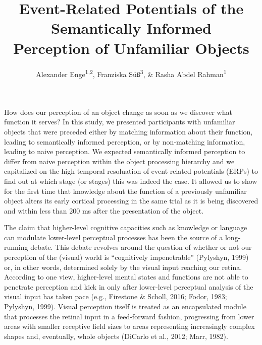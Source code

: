 \documentclass[
  english,
  man,floatsintext]{apa7}
\title{Event-Related Potentials of the Semantically Informed\\
Perception of Unfamiliar Objects}
\author{Alexander Enge\textsuperscript{1,2}, Franziska Süß\textsuperscript{3}, \& Rasha Abdel Rahman\textsuperscript{1}}
\date{}
\affiliation{\vspace{0.5cm}\textsuperscript{1} Humboldt-Universität zu Berlin\\\textsuperscript{2} Max Planck Institute for Human Cognitive and Brain Sciences\\\textsuperscript{3} Fachhochschule des Mittelstands}
\begin{document}
\maketitle

How does our perception of an object change as soon as we discover what function it serves? In this study, we presented participants with unfamiliar objects that were preceded either by matching information about their function, leading to semantically informed perception, or by non-matching information, leading to naive perception. We expected semantically informed perception to differ from naive perception within the object processing hierarchy and we capitalized on the high temporal resoluation of event-related potentials (ERPs) to find out at which stage (or stages) this was indeed the case. It allowed us to show for the first time that knowledge about the function of a previously unfamiliar object alters its early cortical processing in the same trial as it is being discovered and within less than 200 ms after the presentation of the object.

The claim that higher-level cognitive capacities such as knowledge or language can modulate lower-level perceptual processes has been the source of a long-running debate. This debate revolves around the question of whether or not our perception of the (visual) world is ``cognitively impenetrable'' (Pylyshyn, 1999) or, in other words, determined solely by the visual input reaching our retina. According to one view, higher-level mental states and functions are not able to penetrate perception and kick in only after lower-level perceptual analysis of the visual input has taken pace (e.g., Firestone \& Scholl, 2016; Fodor, 1983; Pylyshyn, 1999). Visual perception itself is treated as an encapsulated module that processes the retinal input in a feed-forward fashion, progressing from lower areas with smaller receptive field sizes to areas representing increasingly complex shapes and, eventually, whole objects (DiCarlo et al., 2012; Marr, 1982).
\end{document}
